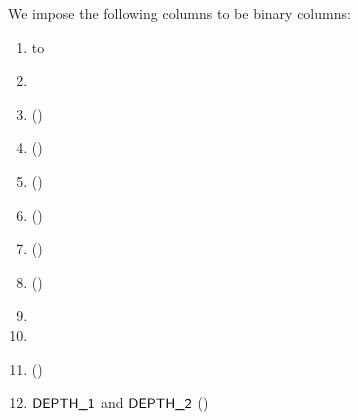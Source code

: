 We impose the following columns to be binary columns:
\begin{multicols}{3}
    \begin{enumerate}
	\item \phaseRlpPrefix{} to \phaseS{}
	\item \lc{}
	\item \lt{} \quad (\trash)
	\item \lx{} \quad (\trash)
	\item \toHashByProver{} \quad (\trash)
	\item \txRequiresEvmExecution{} \quad (\trash)
	\item \phasend{} \quad (\trash)
	\item \done{} \quad (\trash)
	\item \genBit{}
	\item \ispadding{}
	\item \isprefix{} \quad (\trash)
	\item $\textsf{DEPTH\_1}$ and $\textsf{DEPTH\_2}$ \quad (\trash)
    \end{enumerate}
\end{multicols}